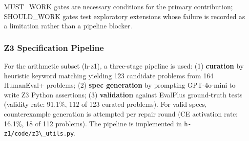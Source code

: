\begin{table}[htbp]
\centering
{}
\end{table}

MUST\_WORK gates are necessary conditions for the primary contribution; SHOULD\_WORK gates test exploratory extensions whose failure is recorded as a limitation rather than a pipeline blocker.

\subsubsection{Z3 Specification Pipeline}

For the arithmetic subset (h-z1), a three-stage pipeline is used: (1) \textbf{curation} by heuristic keyword matching yielding 123 candidate problems from 164 HumanEval+ problems; (2) \textbf{spec generation} by prompting GPT-4o-mini to write Z3 Python assertions; (3) \textbf{validation} against EvalPlus ground-truth tests (validity rate: 91.1\%, 112 of 123 curated problems). For valid specs, counterexample generation is attempted per repair round (CE activation rate: 16.1\%, 18 of 112 problems). The pipeline is implemented in \texttt{h-z1/code/z3\textbackslash \_utils.py}.

